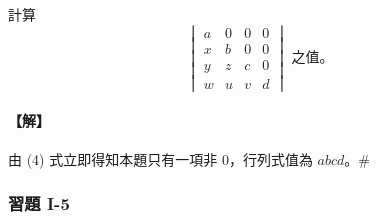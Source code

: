 \begin{example}\label{ex:b6-1-24}
計算
\[ \begin{vmatrix}
a & 0 & 0 & 0 \\
x & b & 0 & 0 \\
y & z & c & 0 \\
w & u & v & d
\end{vmatrix} \text{ 之值。} \]
\end{example}

\paragraph{【解】}
由 (4) 式立即得知本題只有一項非 0，行列式值為 $abcd$。\hfill$\#$

\subsubsection*{習題 I-5}\label{sec:b6-ex1-5}

